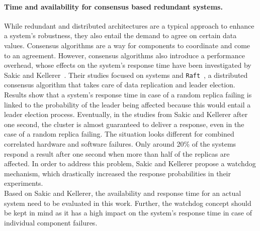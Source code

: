 \paragraph{Time and availability for consensus based redundant systems.}
While redundant and distributed architectures are a typical approach to enhance a system's robustness, they also entail the demand to agree on certain data values.
Consensus algorithms are a way for components to coordinate and come to an agreement.
However, consensus algorithms also introduce a performance overhead, whose effects on the system's response time have been investigated by Sakic and Kellerer~\cite{SakicTimeInConsensus}.
Their studies focused on  systems and \texttt{Raft}~\cite{RaftConsensusPaper}, a distributed consensus algorithm that takes care of data replication and leader election.
Results show that a system's response time in case of a random replica failing is linked to the probability of the leader being affected because this would entail a leader election process.
Eventually, in the studies from Sakic and Kellerer after one second, the cluster is almost guaranteed to deliver a response, even in the case of a random replica failing.
The situation looks different for combined correlated hardware and software failures.
Only around 20\% of the systems respond a result after one second when more than half of the replicas are affected.
In order to address this problem, Sakic and Kellerer propose a watchdog mechanism, which drastically increased the response probabilities in their experiments.
\\

Based on Sakic and Kellerer, the availability and response time for an actual system need to be evaluated in this work.
Further, the watchdog concept should be kept in mind as it has a high impact on the system's response time in case of individual component failures.